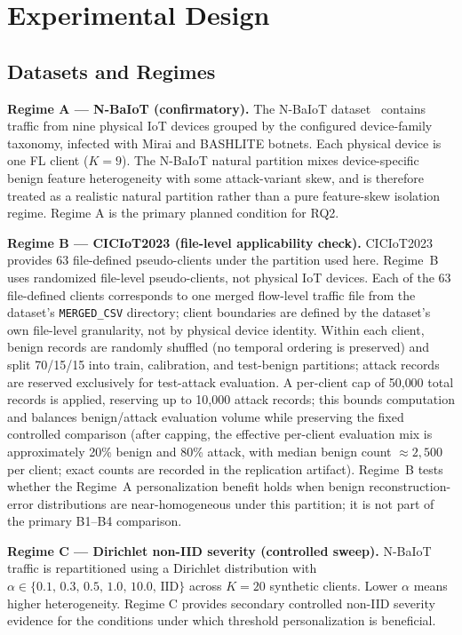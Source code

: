 \section{Experimental Design}
\label{sec:experiments}

\subsection{Datasets and Regimes}

\textbf{Regime A — N-BaIoT (confirmatory).}
The N-BaIoT dataset~\cite{meidan2018n} contains traffic from nine physical IoT devices
grouped by the configured device-family taxonomy, infected with Mirai and BASHLITE botnets.
Each physical device is one FL client ($K=9$).
The N-BaIoT natural partition mixes device-specific benign feature heterogeneity with some
attack-variant skew, and is therefore treated as a realistic natural partition rather than a
pure feature-skew isolation regime.
Regime A is the primary planned condition for RQ2.

\textbf{Regime B --- CICIoT2023 (file-level applicability check).}
CICIoT2023~\cite{neto2023ciciot2023} provides 63 file-defined pseudo-clients under the partition used here.
Regime~B uses randomized file-level pseudo-clients, not physical IoT devices.
Each of the 63 file-defined clients corresponds to one merged flow-level traffic file from the dataset's
\texttt{MERGED\_CSV} directory; client boundaries are defined by the dataset's own
file-level granularity, not by physical device identity.
Within each client, benign records are randomly shuffled (no temporal ordering is preserved)
and split 70/15/15 into train, calibration, and test-benign partitions; attack records
are reserved exclusively for test-attack evaluation.
A per-client cap of 50{,}000 total records is applied, reserving up to 10{,}000 attack records;
this bounds computation and balances benign/attack evaluation volume while preserving
the fixed controlled comparison (after capping, the effective per-client evaluation mix is
approximately 20\% benign and 80\% attack, with median benign count ${\approx}2{,}500$
per client; exact counts are recorded in the replication artifact).
Regime~B tests whether the Regime~A personalization benefit holds when benign
reconstruction-error distributions are near-homogeneous under this partition;
it is not part of the primary B1--B4 comparison.

\textbf{Regime C — Dirichlet non-IID severity (controlled sweep).}
N-BaIoT traffic is repartitioned using a Dirichlet distribution with
$\alpha \in \{0.1,\, 0.3,\, 0.5,\, 1.0,\, 10.0,\, \mathrm{IID}\}$ across $K=20$ synthetic clients.
Lower $\alpha$ means higher heterogeneity.
Regime C provides secondary controlled non-IID severity evidence for the conditions under which threshold personalization is beneficial.

